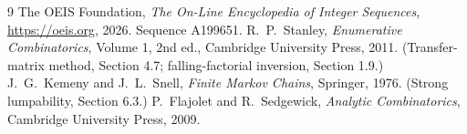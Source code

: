 \documentclass[11pt,a4paper]{article}
\theoremstyle{plain}
\theoremstyle{definition}
\begin{document}
\begin{thebibliography}{9}
 The OEIS Foundation, \emph{The On-Line Encyclopedia of Integer
Sequences}, \url{https://oeis.org}, 2026. Sequence A199651.
 R.~P.~Stanley, \emph{Enumerative Combinatorics}, Volume 1, 2nd ed.,
Cambridge University Press, 2011. (Transfer-matrix method, Section 4.7; falling-factorial
inversion, Section 1.9.)
 J.~G.~Kemeny and J.~L.~Snell, \emph{Finite Markov Chains}, Springer,
1976. (Strong lumpability, Section 6.3.)
 P.~Flajolet and R.~Sedgewick, \emph{Analytic Combinatorics}, Cambridge
University Press, 2009.
\end{thebibliography}
\end{document}
